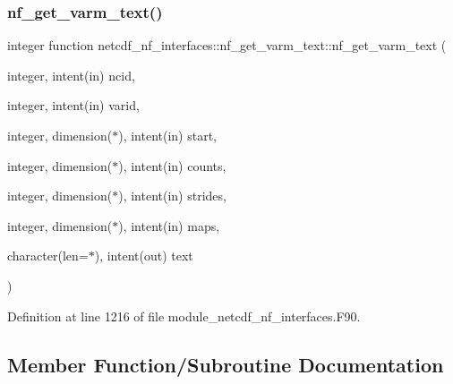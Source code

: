 \subsubsection{\texorpdfstring{nf\+\_\+get\+\_\+varm\+\_\+text()}{nf\_get\_varm\_text()}}
{\footnotesize\ttfamily integer function netcdf\+\_\+nf\+\_\+interfaces\+::nf\+\_\+get\+\_\+varm\+\_\+text\+::nf\+\_\+get\+\_\+varm\+\_\+text (\begin{DoxyParamCaption}\item[{integer, intent(in)}]{ncid,  }\item[{integer, intent(in)}]{varid,  }\item[{integer, dimension($\ast$), intent(in)}]{start,  }\item[{integer, dimension($\ast$), intent(in)}]{counts,  }\item[{integer, dimension($\ast$), intent(in)}]{strides,  }\item[{integer, dimension($\ast$), intent(in)}]{maps,  }\item[{character(len=$\ast$), intent(out)}]{text }\end{DoxyParamCaption})}



Definition at line 1216 of file module\+\_\+netcdf\+\_\+nf\+\_\+interfaces.\+F90.



\subsection{Member Function/\+Subroutine Documentation}
\mbox{\label{interfacenetcdf__nf__interfaces_1_1nf__get__varm__text_adf6138dd1c3f7a7f5f3ddc244b7434cd}} 
